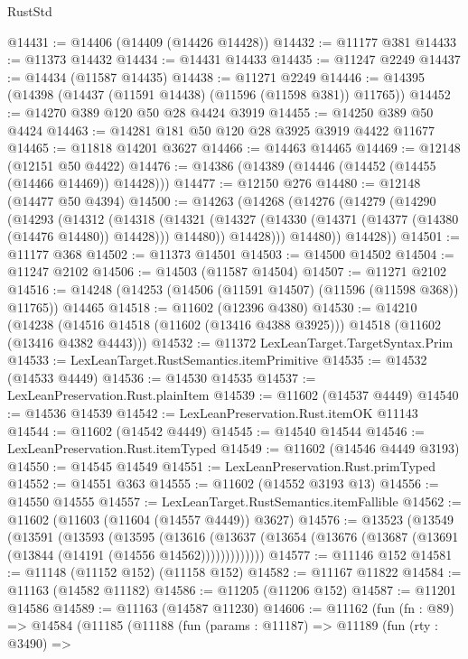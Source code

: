 \begin{lexlean}{RustStd}
\begin{coremodule}
@14431 := @14406 (@14409 (@14426 @14428))
@14432 := @11177 @381
@14433 := @11373 @14432
@14434 := @14431 @14433
@14435 := @11247 @2249
@14437 := @14434 (@11587 @14435)
@14438 := @11271 @2249
@14446 := @14395 (@14398 (@14437 (@11591 @14438) (@11596 (@11598 @381)) @11765))
@14452 := @14270 @389 @120 @50 @28 @4424 @3919
@14455 := @14250 @389 @50 @4424
@14463 := @14281 @181 @50 @120 @28 @3925 @3919 @4422 @11677
@14465 := @11818 @14201 @3627
@14466 := @14463 @14465
@14469 := @12148 (@12151 @50 @4422)
@14476 := @14386 (@14389 (@14446 (@14452 (@14455 (@14466 @14469)) @14428)))
@14477 := @12150 @276
@14480 := @12148 (@14477 @50 @4394)
@14500 := @14263
    (@14268
      (@14276
        (@14279
          (@14290
            (@14293
              (@14312
                (@14318
                  (@14321
                    (@14327 (@14330 (@14371 (@14377 (@14380 (@14476 @14480)) @14428))) @14480))
                  @14428)))
            @14480))
        @14428))
@14501 := @11177 @368
@14502 := @11373 @14501
@14503 := @14500 @14502
@14504 := @11247 @2102
@14506 := @14503 (@11587 @14504)
@14507 := @11271 @2102
@14516 := @14248 (@14253 (@14506 (@11591 @14507) (@11596 (@11598 @368)) @11765)) @14465
@14518 := @11602 (@12396 @4380)
@14530 := @14210
    (@14238 (@14516 @14518 (@11602 (@13416 @4388 @3925))) @14518 (@11602 (@13416 @4382 @4443)))
@14532 := @11372 LexLeanTarget.TargetSyntax.Prim
@14533 := LexLeanTarget.RustSemantics.itemPrimitive
@14535 := @14532 (@14533 @4449)
@14536 := @14530 @14535
@14537 := LexLeanPreservation.Rust.plainItem
@14539 := @11602 (@14537 @4449)
@14540 := @14536 @14539
@14542 := LexLeanPreservation.Rust.itemOK @11143
@14544 := @11602 (@14542 @4449)
@14545 := @14540 @14544
@14546 := LexLeanPreservation.Rust.itemTyped
@14549 := @11602 (@14546 @4449 @3193)
@14550 := @14545 @14549
@14551 := LexLeanPreservation.Rust.primTyped
@14552 := @14551 @363
@14555 := @11602 (@14552 @3193 @13)
@14556 := @14550 @14555
@14557 := LexLeanTarget.RustSemantics.itemFallible
@14562 := @11602 (@11603 (@11604 (@14557 @4449)) @3627)
@14576 := @13523
    (@13549
      (@13591
        (@13593
          (@13595
            (@13616
              (@13637 (@13654 (@13676 (@13687 (@13691 (@13844 (@14191 (@14556 @14562)))))))))))))
@14577 := @11146 @152
@14581 := @11148 (@11152 @152) (@11158 @152)
@14582 := @11167 @11822
@14584 := @11163 (@14582 @11182)
@14586 := @11205 (@11206 @152)
@14587 := @11201 @14586
@14589 := @11163 (@14587 @11230)
@14606 := @11162
    (fun (fn : @89) =>
    @14584
      (@11185
        (@11188
          (fun (params : @11187) =>
          @11189
            (fun (rty : @3490) =>

\end{coremodule}
\end{lexlean}

